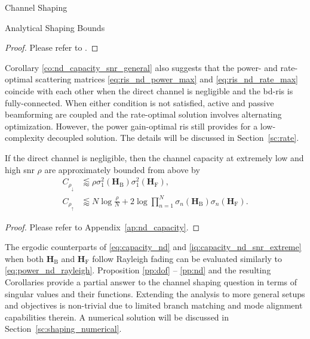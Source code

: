 \documentclass[journal]{IEEEtran}
\begin{document}
\begin{section}{Channel Shaping}
\begin{subsection}{Analytical Shaping Bounds}
		\begin{proof}
			Please refer to \cite[Appendix~A]{Bartoli2023}.
		\end{proof}

		Corollary \ref{co:nd_capacity_snr_general} also suggests that the power- and rate-optimal scattering matrices \eqref{eq:ris_nd_power_max} and \eqref{eq:ris_nd_rate_max} coincide with each other when the direct channel is negligible and the \gls{bd}-\gls{ris} is fully-connected.
		When either condition is not satisfied, active and passive beamforming are coupled and the rate-optimal solution involves alternating optimization.
		However, the power gain-optimal \gls{ris} still provides for a low-complexity decoupled solution.
		The details will be discussed in Section~\ref{sc:rate}.

		\begin{corollary}
			\label{co:nd_capacity_snr_extreme}
			If the direct channel is negligible, then the channel capacity at extremely low and high \gls{snr} $\rho$ are approximately bounded from above by
			\begin{subequations}
				\label{iq:capacity_nd_snr_extreme}
				\begin{align}
					C_{\rho_\downarrow} & \lessapprox \rho \sigma_1^2(\mathbf{H}_\mathrm{B}) \sigma_1^2(\mathbf{H}_\mathrm{F}), \label{iq:capacity_nd_snr_low}                                           \\
					C_{\rho_\uparrow}   & \lessapprox N \log \frac{\rho}{N} + 2 \log \prod_{n=1}^N \sigma_n(\mathbf{H}_\mathrm{B}) \sigma_n(\mathbf{H}_\mathrm{F}). \label{iq:capacity_nd_snr_high}
				\end{align}
			\end{subequations}
		\end{corollary}

		\begin{proof}
			Please refer to Appendix~\ref{ap:nd_capacity}.
		\end{proof}

		The ergodic counterparts of \eqref{eq:capacity_nd} and \eqref{iq:capacity_nd_snr_extreme} when both $\mathbf{H}_\mathrm{B}$ and $\mathbf{H}_\mathrm{F}$ follow Rayleigh fading can be evaluated similarly to \eqref{eq:power_nd_rayleigh}.
		Proposition \ref{pp:dof} -- \ref{pp:nd} and the resulting Corollaries provide a partial answer to the channel shaping question in terms of singular values and their functions.
		Extending the analysis to more general setups and objectives is non-trivial due to limited branch matching and mode alignment capabilities therein.
		A numerical solution will be discussed in Section~\ref{sc:shaping_numerical}.
	\end{subsection}


\end{section}
\end{document}

